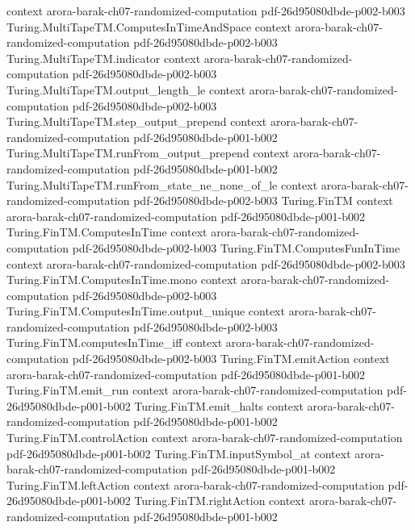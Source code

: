 \begin{theorem}
  {context}
  {arora-barak-ch07-randomized-computation}
  {pdf-26d95080dbde-p002-b003}
\proofstep
  {Turing.MultiTapeTM.ComputesInTimeAndSpace}
  {context}
  {arora-barak-ch07-randomized-computation}
  {pdf-26d95080dbde-p002-b003}
\proofstep
  {Turing.MultiTapeTM.indicator}
  {context}
  {arora-barak-ch07-randomized-computation}
  {pdf-26d95080dbde-p002-b003}
\proofstep
  {Turing.MultiTapeTM.output_length_le}
  {context}
  {arora-barak-ch07-randomized-computation}
  {pdf-26d95080dbde-p002-b003}
\proofstep
  {Turing.MultiTapeTM.step_output_prepend}
  {context}
  {arora-barak-ch07-randomized-computation}
  {pdf-26d95080dbde-p001-b002}
\proofstep
  {Turing.MultiTapeTM.runFrom_output_prepend}
  {context}
  {arora-barak-ch07-randomized-computation}
  {pdf-26d95080dbde-p001-b002}
\proofstep
  {Turing.MultiTapeTM.runFrom_state_ne_none_of_le}
  {context}
  {arora-barak-ch07-randomized-computation}
  {pdf-26d95080dbde-p002-b003}
\proofstep
  {Turing.FinTM}
  {context}
  {arora-barak-ch07-randomized-computation}
  {pdf-26d95080dbde-p001-b002}
\proofstep
  {Turing.FinTM.ComputesInTime}
  {context}
  {arora-barak-ch07-randomized-computation}
  {pdf-26d95080dbde-p002-b003}
\proofstep
  {Turing.FinTM.ComputesFunInTime}
  {context}
  {arora-barak-ch07-randomized-computation}
  {pdf-26d95080dbde-p002-b003}
\proofstep
  {Turing.FinTM.ComputesInTime.mono}
  {context}
  {arora-barak-ch07-randomized-computation}
  {pdf-26d95080dbde-p002-b003}
\proofstep
  {Turing.FinTM.ComputesInTime.output_unique}
  {context}
  {arora-barak-ch07-randomized-computation}
  {pdf-26d95080dbde-p002-b003}
\proofstep
  {Turing.FinTM.computesInTime_iff}
  {context}
  {arora-barak-ch07-randomized-computation}
  {pdf-26d95080dbde-p002-b003}
\proofstep
  {Turing.FinTM.emitAction}
  {context}
  {arora-barak-ch07-randomized-computation}
  {pdf-26d95080dbde-p001-b002}
\proofstep
  {Turing.FinTM.emit_run}
  {context}
  {arora-barak-ch07-randomized-computation}
  {pdf-26d95080dbde-p001-b002}
\proofstep
  {Turing.FinTM.emit_halts}
  {context}
  {arora-barak-ch07-randomized-computation}
  {pdf-26d95080dbde-p001-b002}
\proofstep
  {Turing.FinTM.controlAction}
  {context}
  {arora-barak-ch07-randomized-computation}
  {pdf-26d95080dbde-p001-b002}
\proofstep
  {Turing.FinTM.inputSymbol_at}
  {context}
  {arora-barak-ch07-randomized-computation}
  {pdf-26d95080dbde-p001-b002}
\proofstep
  {Turing.FinTM.leftAction}
  {context}
  {arora-barak-ch07-randomized-computation}
  {pdf-26d95080dbde-p001-b002}
\proofstep
  {Turing.FinTM.rightAction}
  {context}
  {arora-barak-ch07-randomized-computation}
  {pdf-26d95080dbde-p001-b002}

\end{theorem}
